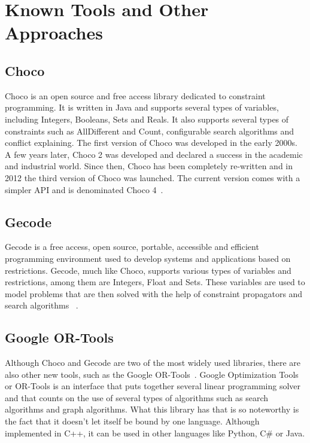 \section{Known Tools and Other Approaches}

\subsection{Choco}

Choco is an open source and free access library dedicated to constraint programming. It is written in Java and supports several types of variables, including Integers, Booleans, Sets and Reals. It also supports several types of constraints such as AllDifferent and Count, configurable search algorithms and conflict explaining. The first version of Choco was developed in the early 2000s. A few years later, Choco 2 was developed and declared a success in the academic and industrial world. Since then, Choco has been completely re-written and in 2012 the third version of Choco was launched. The current version comes with a simpler API and is denominated Choco 4~\cite{chocoSolver}.

\subsection{Gecode}

Gecode is a free access, open source, portable, accessible and efficient programming environment used to develop systems and applications based on restrictions. Gecode, much like Choco, supports various types of variables and restrictions, among them are Integers, Float and Sets. These variables are used to model problems that are then solved with the help of constraint propagators and search algorithms \cite{MPG:M:5.1.0}~\cite{gecode}.

\subsection{Google OR-Tools}

Although Choco and Gecode are two of the most widely used libraries, there are also other new tools, such as the Google OR-Tools~\cite{ORTools}. Google Optimization Tools or OR-Tools is an interface that puts together several linear programming solver and that counts on the use of several types of algorithms such as search algorithms and graph algorithms. What this library has that is so noteworthy is the fact that it doesn't let itself be bound by one language. Although implemented in C++, it can be used in other languages like Python, C\# or Java.